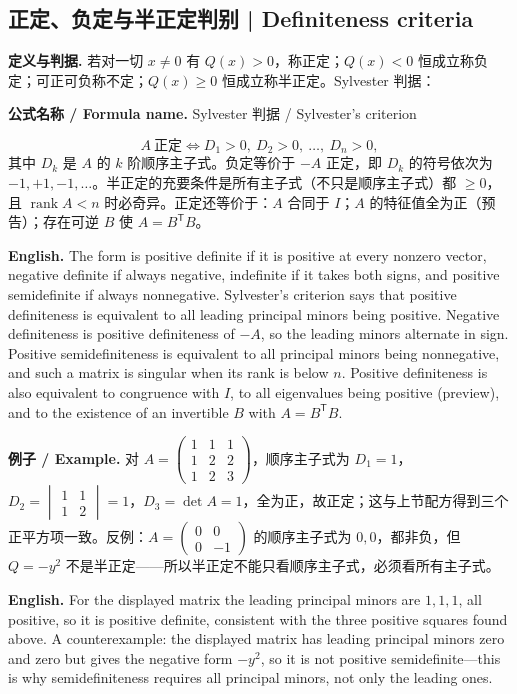 \documentclass[UTF8,11pt,a4paper]{ctexart}
\newcommand{\EN}[1]{\par\noindent\textbf{English.} #1\par}
\newcommand{\FORMULA}[2]{\par\noindent\textbf{公式名称 / Formula name.} #1 / #2\par}
\newcommand{\EX}[2]{\par\noindent\textbf{例子 / Example.} #1\par\EN{#2}}
\begin{document}
\subsection{正定、负定与半正定判别 | Definiteness criteria}
\noindent\textbf{定义与判据.} 若对一切 $x\ne0$ 有 $Q(x)>0$，称正定；$Q(x)<0$ 恒成立称负定；可正可负称不定；$Q(x)\ge0$ 恒成立称半正定。Sylvester 判据：
\FORMULA{Sylvester 判据}{Sylvester's criterion}
\[
A\ \text{正定}\iff D_1>0,\ D_2>0,\ \dots,\ D_n>0,
\]
其中 $D_k$ 是 $A$ 的 $k$ 阶顺序主子式。负定等价于 $-A$ 正定，即 $D_k$ 的符号依次为 $-1,+1,-1,\dots$。半正定的充要条件是所有主子式（不只是顺序主子式）都 $\ge0$，且 $\operatorname{rank}A<n$ 时必奇异。正定还等价于：$A$ 合同于 $I$；$A$ 的特征值全为正（预告）；存在可逆 $B$ 使 $A=B^{\mathsf T}B$。
\EN{The form is positive definite if it is positive at every nonzero vector, negative definite if always negative, indefinite if it takes both signs, and positive semidefinite if always nonnegative. Sylvester's criterion says that positive definiteness is equivalent to all leading principal minors being positive. Negative definiteness is positive definiteness of $-A$, so the leading minors alternate in sign. Positive semidefiniteness is equivalent to all principal minors being nonnegative, and such a matrix is singular when its rank is below $n$. Positive definiteness is also equivalent to congruence with $I$, to all eigenvalues being positive (preview), and to the existence of an invertible $B$ with $A=B^{\mathsf T}B$.}
\EX{对 $A=\begin{pmatrix}1&1&1\\1&2&2\\1&2&3\end{pmatrix}$，顺序主子式为 $D_1=1$，$D_2=\begin{vmatrix}1&1\\1&2\end{vmatrix}=1$，$D_3=\det A=1$，全为正，故正定；这与上节配方得到三个正平方项一致。反例：$A=\begin{pmatrix}0&0\\0&-1\end{pmatrix}$ 的顺序主子式为 $0,0$，都非负，但 $Q=-y^2$ 不是半正定——所以半正定不能只看顺序主子式，必须看所有主子式。}{For the displayed matrix the leading principal minors are $1,1,1$, all positive, so it is positive definite, consistent with the three positive squares found above. A counterexample: the displayed matrix has leading principal minors zero and zero but gives the negative form $-y^2$, so it is not positive semidefinite—this is why semidefiniteness requires all principal minors, not only the leading ones.}
\end{document}
